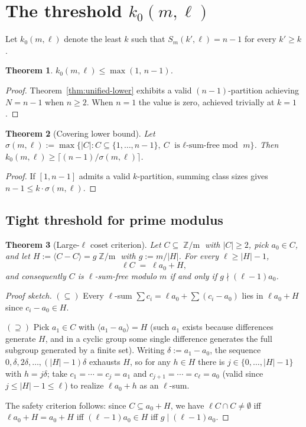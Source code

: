 \documentclass[11pt]{amsart}
\theoremstyle{plain}
\newtheorem{theorem}{Theorem}[section]
\theoremstyle{definition}
\DeclareMathOperator{\Zm}{\mathbb{Z}/m}
\begin{document}
\section{The threshold $k_0(m,\ell)$}\label{sec:threshold}

Let $k_0(m,\ell)$ denote the least $k$ such that $S_m(k',\ell) = n-1$ for every $k'\ge k$.

\begin{theorem}\label{thm:k0-upper}
$k_0(m,\ell) \le \max(1,\,n-1)$.
\end{theorem}
\begin{proof}
Theorem~\ref{thm:unified-lower} exhibits a valid $(n-1)$-partition achieving $N=n-1$ when $n\ge 2$. When $n=1$ the value is zero, achieved trivially at $k=1$.
\end{proof}

\begin{theorem}[Covering lower bound]\label{thm:k0-lower-cov}
Let $\sigma(m,\ell) := \max\{|C| : C\subseteq\{1,\ldots,n-1\},\ C\text{ is $\ell$-sum-free mod }m\}$. Then $k_0(m,\ell)\ge \lceil (n-1)/\sigma(m,\ell)\rceil$.
\end{theorem}
\begin{proof}
If $[1,n-1]$ admits a valid $k$-partition, summing class sizes gives $n-1 \le k\cdot\sigma(m,\ell)$.
\end{proof}

\subsection{Tight threshold for prime modulus}

\begin{theorem}[Large-$\ell$ coset criterion]\label{thm:coset}
Let $C\subseteq\Zm$ with $|C|\ge 2$, pick $a_0\in C$, and let $H := \langle C-C\rangle = g\Zm$ with $g := m/|H|$. For every $\ell\ge |H|-1$,
\[
\ell C \;=\; \ell a_0 + H,
\]
and consequently $C$ is $\ell$-sum-free modulo $m$ if and only if $g\nmid (\ell-1)a_0$.
\end{theorem}
\begin{proof}[Proof sketch]
$(\subseteq)$ Every $\ell$-sum $\sum c_i = \ell a_0 + \sum(c_i-a_0)$ lies in $\ell a_0 + H$ since $c_i-a_0\in H$.

$(\supseteq)$ Pick $a_1\in C$ with $\langle a_1-a_0\rangle = H$ (such $a_1$ exists because differences generate $H$, and in a cyclic group some single difference generates the full subgroup generated by a finite set). Writing $\delta := a_1 - a_0$, the sequence $0,\delta,2\delta,\ldots,(|H|-1)\delta$ exhausts $H$, so for any $h\in H$ there is $j\in\{0,\ldots,|H|-1\}$ with $h = j\delta$; take $c_1=\cdots=c_j = a_1$ and $c_{j+1}=\cdots=c_\ell = a_0$ (valid since $j\le|H|-1\le\ell$) to realize $\ell a_0 + h$ as an $\ell$-sum.

The safety criterion follows: since $C\subseteq a_0+H$, we have $\ell C\cap C\ne\emptyset$ iff $\ell a_0+H = a_0+H$ iff $(\ell-1)a_0\in H$ iff $g\mid(\ell-1)a_0$.
\end{proof}
\end{document}
